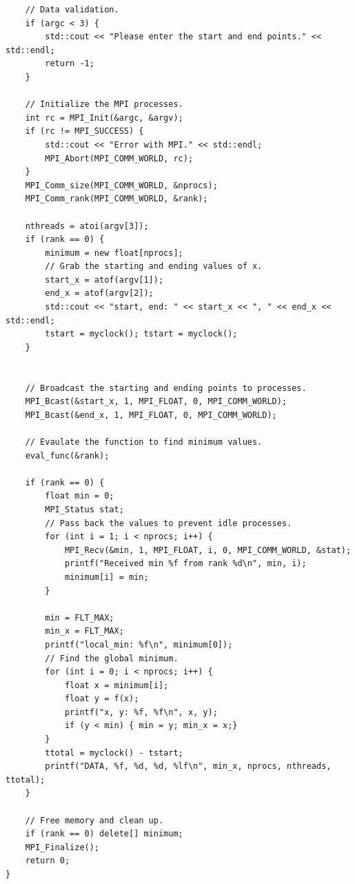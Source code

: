 \documentclass[notitlepage, letterpaper, 12pt]{report}
\begin{document}
\begin{lstlisting}
	// Data validation.
	if (argc < 3) {
		std::cout << "Please enter the start and end points." << std::endl;
		return -1;
	}

	// Initialize the MPI processes.
	int rc = MPI_Init(&argc, &argv);
	if (rc != MPI_SUCCESS) {
		std::cout << "Error with MPI." << std::endl;
		MPI_Abort(MPI_COMM_WORLD, rc);
	}
	MPI_Comm_size(MPI_COMM_WORLD, &nprocs);
	MPI_Comm_rank(MPI_COMM_WORLD, &rank);
		
	nthreads = atoi(argv[3]);	
	if (rank == 0) {
		minimum = new float[nprocs];
		// Grab the starting and ending values of x.	
		start_x = atof(argv[1]);
		end_x = atof(argv[2]);
		std::cout << "start, end: " << start_x << ", " << end_x << std::endl;
		tstart = myclock(); tstart = myclock();
	}


	// Broadcast the starting and ending points to processes.
	MPI_Bcast(&start_x, 1, MPI_FLOAT, 0, MPI_COMM_WORLD);
	MPI_Bcast(&end_x, 1, MPI_FLOAT, 0, MPI_COMM_WORLD);
	
	// Evaulate the function to find minimum values.
	eval_func(&rank);

	if (rank == 0) {
		float min = 0;
		MPI_Status stat;
		// Pass back the values to prevent idle processes. 
		for (int i = 1; i < nprocs; i++) {
			MPI_Recv(&min, 1, MPI_FLOAT, i, 0, MPI_COMM_WORLD, &stat);
			printf("Received min %f from rank %d\n", min, i);
			minimum[i] = min; 
		}
		
		min = FLT_MAX;
		min_x = FLT_MAX;
		printf("local_min: %f\n", minimum[0]);
		// Find the global minimum.
		for (int i = 0; i < nprocs; i++) {
			float x = minimum[i];
			float y = f(x);
			printf("x, y: %f, %f\n", x, y);
			if (y < min) { min = y; min_x = x;}	
		}
		ttotal = myclock() - tstart;
		printf("DATA, %f, %d, %d, %lf\n", min_x, nprocs, nthreads, ttotal);	
	}

	// Free memory and clean up. 
	if (rank == 0) delete[] minimum;
	MPI_Finalize();
	return 0;
}

\end{lstlisting}

\newpage
\end{document}
